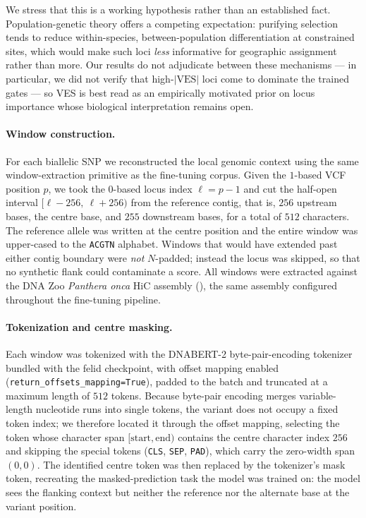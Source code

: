 \documentclass[twocolumn,10pt]{article}
\begin{document}
We stress that this is a working hypothesis rather than an established fact. Population-genetic
theory offers a competing expectation: purifying selection tends to reduce within-species,
between-population differentiation at constrained sites, which would make such loci \emph{less}
informative for geographic assignment rather than more. Our results do not adjudicate between these
mechanisms --- in particular, we did not verify that high-$|\mathrm{VES}|$ loci come to dominate the
trained gates --- so VES is best read as an empirically motivated prior on locus importance whose
biological interpretation remains open.

\paragraph{Window construction.} For each biallelic SNP we reconstructed the local genomic context
using the same window-extraction primitive as the fine-tuning corpus. Given the $1$-based VCF
position $p$, we took the $0$-based locus index $\ell = p-1$ and cut the half-open interval
$[\ell-256,\ \ell+256)$ from the reference contig, that is, $256$ upstream bases, the centre base,
and $255$ downstream bases, for a total of $512$ characters. The reference allele was written at the
centre position and the entire window was upper-cased to the \texttt{ACGTN} alphabet. Windows that
would have extended past either contig boundary were \emph{not} $N$-padded; instead the locus was
skipped, so that no synthetic flank could contaminate a score. All windows were extracted against
the DNA Zoo \emph{Panthera onca} HiC assembly
(\texttt{}), the
same assembly configured throughout the fine-tuning pipeline.

\paragraph{Tokenization and centre masking.} Each window was tokenized with the DNABERT-2
byte-pair-encoding tokenizer \citep{zhou2024dnabert} bundled with the felid checkpoint, with offset
mapping enabled (\texttt{return\_offsets\_mapping=True}), padded to the batch and truncated at a
maximum length of $512$ tokens. Because byte-pair encoding merges variable-length nucleotide runs
into single tokens, the variant does not occupy a fixed token index; we therefore located it through
the offset mapping, selecting the token whose character span $[\text{start},\text{end})$ contains
the centre character index $256$ and skipping the special tokens (\texttt{CLS}, \texttt{SEP},
\texttt{PAD}), which carry the zero-width span $(0,0)$. The identified centre token was then
replaced by the tokenizer's mask token, recreating the masked-prediction task the model was trained
on: the model sees the flanking context but neither the reference nor the alternate base at the
variant position.
\end{document}
